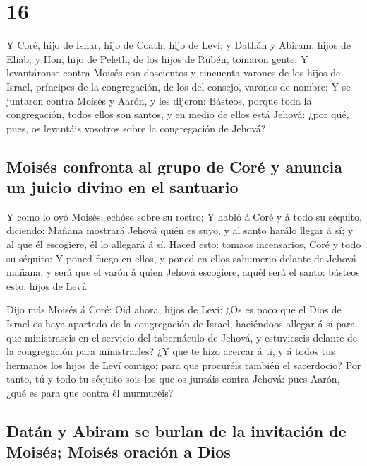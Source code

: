\hypertarget{section-15}{%
\section{16}\label{section-15}}

 Y Coré, hijo de Ishar, hijo de Coath, hijo de Leví; y
Dathán y Abiram, hijos de Eliab; y Hon, hijo de Peleth, de los hijos de
Rubén, tomaron gente,  Y levantáronse contra Moisés con
doscientos y cincuenta varones de los hijos de Israel, príncipes de la
congregación, de los del consejo, varones de nombre;  Y se
juntaron contra Moisés y Aarón, y les dijeron: Básteos, porque toda la
congregación, todos ellos son santos, y en medio de ellos está Jehová:
¿por qué, pues, os levantáis vosotros sobre la congregación de Jehová?

\hypertarget{moisuxe9s-confronta-al-grupo-de-coruxe9-y-anuncia-un-juicio-divino-en-el-santuario}{%
\subsection{Moisés confronta al grupo de Coré y anuncia un juicio divino
en el
santuario}\label{moisuxe9s-confronta-al-grupo-de-coruxe9-y-anuncia-un-juicio-divino-en-el-santuario}}

 Y como lo oyó Moisés, echóse sobre su rostro;
 Y habló á Coré y á todo su séquito, diciendo: Mañana
mostrará Jehová quién es suyo, y al santo harálo llegar á sí; y al que
él escogiere, él lo allegará á sí.  Haced esto: tomaos
incensarios, Coré y todo su séquito:  Y poned fuego en
ellos, y poned en ellos sahumerio delante de Jehová mañana; y será que
el varón á quien Jehová escogiere, aquél será el santo: básteos esto,
hijos de Leví.

 Dijo más Moisés á Coré: Oid ahora, hijos de Leví:
 ¿Os es poco que el Dios de Israel os haya apartado de la
congregación de Israel, haciéndoos allegar á sí para que ministraseis en
el servicio del tabernáculo de Jehová, y estuvieseis delante de la
congregación para ministrarles?  ¿Y que te hizo acercar á
ti, y á todos tus hermanos los hijos de Leví contigo; para que procuréis
también el sacerdocio?  Por tanto, tú y todo tu séquito
sois los que os juntáis contra Jehová: pues Aarón, ¿qué es para que
contra él murmuréis?

\hypertarget{datuxe1n-y-abiram-se-burlan-de-la-invitaciuxf3n-de-moisuxe9s-moisuxe9s-oraciuxf3n-a-dios}{%
\subsection{Datán y Abiram se burlan de la invitación de Moisés; Moisés
oración a
Dios}\label{datuxe1n-y-abiram-se-burlan-de-la-invitaciuxf3n-de-moisuxe9s-moisuxe9s-oraciuxf3n-a-dios}}

